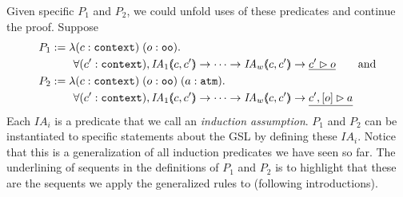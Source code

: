Given specific $P_1$ and $P_2$, we could unfold uses of these predicates and continue the proof.
Suppose
\begin{align*}
P_1 &:= \lambda (c : \sltm{context}) \; (o : \sltm{oo}) . \\
& \qquad \forall (\inddyncon{} : \sltm{context}), \mathit{IA}_1 \args{c,\inddyncon{}} \rightarrow \dots \rightarrow \mathit{IA}_w \args{c,\inddyncon{}} \rightarrow \underline{\seqsl[\inddyncon{}]{o}} \qquad \mathrm{and}\\
P_2 &:= \lambda (c : \sltm{context}) \; (o : \sltm{oo}) \; (a : \sltm{atm}) . \\
& \qquad \forall (\inddyncon{} : \sltm{context}), \mathit{IA}_1 \args{c,\inddyncon{}} \rightarrow \dots \rightarrow \mathit{IA}_w \args{c,\inddyncon{}} \rightarrow \underline{\bchsl[\inddyncon{}]{o}{a}}
\end{align*}
Each $\mathit{IA}_i$ is a predicate that we call an \emph{induction assumption}. $P_1$ and $P_2$ can be instantiated to specific statements about the GSL by defining these $\mathit{IA}_i$. Notice that this is a generalization of all induction predicates we have seen so far. The underlining of sequents in the definitions of $P_1$ and $P_2$ is to highlight that these are the sequents we apply the generalized rules to (following introductions).

